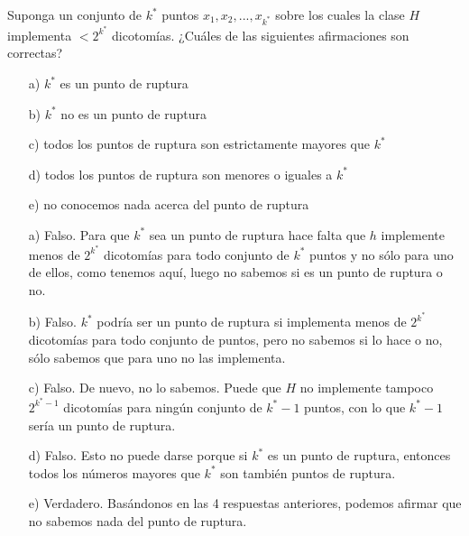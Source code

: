 \documentclass[12pt]{article}
\theoremstyle{definition}
\begin{document}
\begin{pregunta}
Suponga un conjunto de $k^*$ puntos $x_1,x_2,...,x_{k^*}$ sobre los cuales la clase $H$ implementa $<2^{k^*}$ dicotomías. ¿Cuáles de las siguientes afirmaciones son correctas?
\begin{enumerate}
\item[a)] $k^*$ es un punto de ruptura
\item[b)] $k^*$ no es un punto de ruptura
\item[c)] todos los puntos de ruptura son estrictamente mayores que $k^*$
\item[d)] todos los puntos de ruptura son menores o iguales a $k^*$
\item[e)] no conocemos nada acerca del punto de ruptura
\end{enumerate}

\begin{enumerate}
\item[a)] Falso. Para que $k^*$ sea un punto de ruptura hace falta que $h$ implemente menos de $2^{k^*}$ dicotomías para todo conjunto de $k^*$ puntos y no sólo para uno de ellos, como tenemos aquí, luego no sabemos si es un punto de ruptura o no.
\item[b)] Falso. $k^*$ podría ser un punto de ruptura si implementa menos de $2^{k^*}$ dicotomías para todo conjunto de puntos, pero no sabemos si lo hace o no, sólo sabemos que para uno no las implementa.
\item[c)] Falso. De nuevo, no lo sabemos. Puede que $H$ no implemente tampoco $2^{k^*-1}$ dicotomías para ningún conjunto de $k^*-1$ puntos, con lo que $k^*-1$ sería un punto de ruptura.
\item[d)] Falso. Esto no puede darse porque si $k^*$ es un punto de ruptura, entonces todos los números mayores que $k^*$ son también puntos de ruptura.
\item[e)] Verdadero. Basándonos en las 4 respuestas anteriores, podemos afirmar que no sabemos nada del punto de ruptura. 
\end{enumerate}
\end{pregunta}
\end{document}
